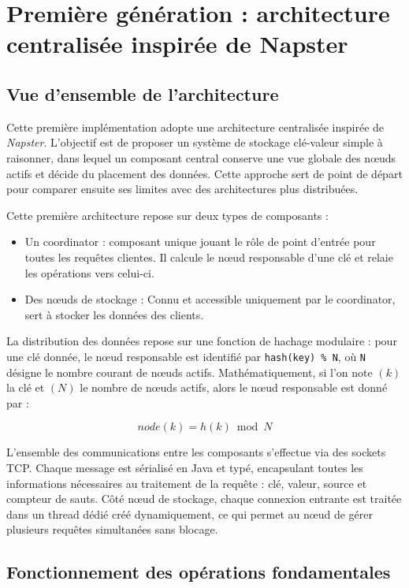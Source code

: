 \newpage
\section{Première génération : architecture centralisée inspirée de Napster}

\subsection{Vue d’ensemble de l’architecture}

Cette première implémentation adopte une architecture centralisée inspirée de \textit{Napster}. L'objectif est de proposer un système de stockage clé-valeur simple à raisonner, dans lequel un composant central conserve une vue globale des nœuds actifs et décide du placement des données. Cette approche sert de point de départ pour comparer ensuite ses limites avec des architectures plus distribuées.

Cette première architecture repose sur deux types de composants :
\begin{itemize}
    \item Un coordinator : composant unique jouant le rôle de point d’entrée pour toutes les requêtes clientes. Il calcule le nœud responsable d’une clé et relaie les opérations vers celui-ci.
    \item Des nœuds de stockage : Connu et accessible uniquement par le coordinator, sert à stocker les données des clients.
\end{itemize}

La distribution des données repose sur une fonction de hachage modulaire : pour une clé donnée, le nœud responsable est identifié par \texttt{hash(key) \% N}, où \texttt{N} désigne le nombre courant de nœuds actifs. Mathématiquement, si l'on note \((k)\) la clé et \((N)\) le nombre de nœuds actifs, alors le nœud responsable est donné par :

\[
    node(k) = h(k) \bmod N
\]

L'ensemble des communications entre les composants s'effectue via des sockets TCP. Chaque message est sérialisé en Java et typé, encapsulant toutes les informations nécessaires au traitement de la requête : clé, valeur, source et compteur de sauts. Côté nœud de stockage, chaque connexion entrante est traitée dans un thread dédié créé dynamiquement, ce qui permet au nœud de gérer plusieurs requêtes simultanées sans blocage.


\subsection{Fonctionnement des opérations fondamentales}

